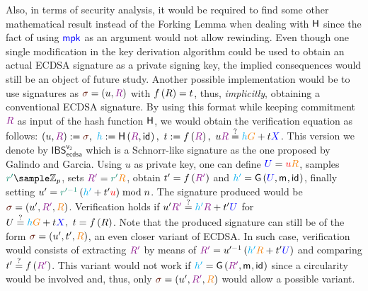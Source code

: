 \documentclass[version=submission, floatrow]{iacrcc}
\begin{document}
Also, in terms of security analysis, it would be required to find some other mathematical result instead of the Forking Lemma \cite{Pointcheval2000} when dealing with $\mathsf{H}$ since the fact of using $\textcolor{blue}{\mathsf{mpk}}$ as an argument would not allow rewinding. Even though one single modification in the key derivation algorithm could be used to obtain an actual ECDSA signature as a private signing key, the implied consequences would still be an object of future study. Another possible implementation would be to use signatures as $\Signature{} = \left(u, \Commitment{R}\right)$ with $f\left(R\right) = t$, thus, \emph{implicitly}, obtaining a conventional ECDSA signature. 
%
By using this format while keeping commitment $\Commitment{R}$ as input of the hash function $\mathsf{H}$, we would obtain the verification equation as follows: $\left(u, \Commitment{R}\right) := \Signature{},\ \Digest{h} := \HashH{\Commitment{R}, \id{}},\ t:= \ProjFunction{\Commitment{R}},\ u\Commitment{R} \overset{?}{=} \Digest{h}\GeneratorEC + t\PubKey{X}$. This version we denote by $\mathsf{IBS}_{\mathsf{ecdsa}}^{\mathsf{v_{2}}}$ which is a Schnorr-like signature as the one proposed by Galindo and Garcia.
%
Using $u$ as private key, one can define $\PubKey{U} = \PrivKey{u}\Generator{R}$, samples $\Nonce{r'} \sample \Zp$, sets $\Commitment{R'} = \Nonce{r'}\Generator{R}$, obtain $t' = \ProjFunction{\Commitment{R'}}$ and $\textcolor{cyan}{h'} = \mathsf{G}\left(\textcolor{blue}{U},\mathsf{m}_{},\mathsf{id}_{}\right)$, finally setting $u' = \Nonce{r'^{-1}}\left(\Digest{h'} + t'\PrivKey{u}\right)\bmod{n}$. The signature produced would be $\Signature{} = \left(u', \Commitment{R'}, \Generator{R}\right)$. Verification holds if $u'\Commitment{R'} \overset{?}{=} \Digest{h'}\Commitment{R} + t'\PubKey{U}$ for $U \overset{?}{=} \Digest{h}\GeneratorEC + t\PubKey{X},\ t = \ProjFunction{R}$. Note that the produced signature can still be of the form $\Signature{} = \left(u', t', \Generator{R}\right)$, an even closer variant of ECDSA. In such case, verification would consists of extracting $\Commitment{R'}$ by means of $\Commitment{R'} = u'^{-1}\left(\Digest{h'}\Generator{R} + t'\PubKey{U}\right)$ and comparing $t' \overset{?}{=} \ProjFunction{\Commitment{R'}}$. This variant would not work if $\Digest{h'} = \HashG{\Commitment{R'}, \msg{}, \id{}}$ since a circularity would be involved and, thus, only $\Signature{} = \left(u', \Commitment{R'}, \Generator{R}\right)$ would allow a possible variant.
\end{document}
